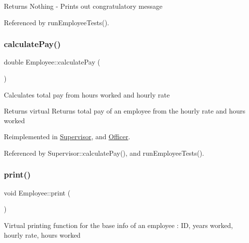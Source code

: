 \begin{DoxyReturn}{Returns}
Nothing -\/ Prints out congratulatory message 
\end{DoxyReturn}


Referenced by run\+Employee\+Tests().

\mbox{\label{classEmployee_a01c2c44e15434237db28832f6972e960}} 
\subsubsection{\texorpdfstring{calculate\+Pay()}{calculatePay()}}
{\footnotesize\ttfamily double Employee\+::calculate\+Pay (\begin{DoxyParamCaption}{ }\end{DoxyParamCaption})\hspace{0.3cm}{\ttfamily [virtual]}}

Calculates total pay from hours worked and hourly rate

\begin{DoxyReturn}{Returns}
virtual Returns total pay of an employee from the hourly rate and hours worked 
\end{DoxyReturn}


Reimplemented in \hyperlink{classSupervisor_aa37daa89523c08b84ae8141299e036f8}{Supervisor}, and \hyperlink{classOfficer_a1fa1aad39b9e95be7a088990ebf17059}{Officer}.



Referenced by Supervisor\+::calculate\+Pay(), and run\+Employee\+Tests().

\mbox{\label{classEmployee_a79556ad700627dba88049f487a34a762}} 
\subsubsection{\texorpdfstring{print()}{print()}}
{\footnotesize\ttfamily void Employee\+::print (\begin{DoxyParamCaption}{ }\end{DoxyParamCaption})\hspace{0.3cm}{\ttfamily [virtual]}}

Virtual printing function for the base info of an employee \+: ID, years worked, hourly rate, hours worked

